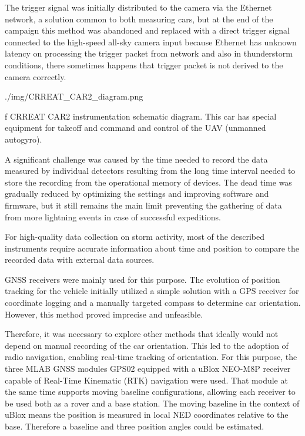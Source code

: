 The trigger signal was initially distributed to the camera via the Ethernet network, a solution common to both measuring cars, but at the end of the campaign this method was abandoned and replaced with a direct trigger signal connected to the high-speed all-sky camera input because Ethernet has unknown latency on processing the trigger packet from network and also in thunderstorm conditions, there sometimes happens that trigger packet is not derived to the camera correctly.

\medskip
{}
\picw=15cm \cinspic ./img/CRREAT_CAR2_diagram.png
\caption/f  CRREAT CAR2 instrumentation schematic diagram. This car has special equipment for takeoff and command and control of the UAV (unmanned autogyro).
\medskip

A significant challenge was caused by the time needed to record the data measured by individual detectors resulting from the long time interval needed to store the recording from the operational memory of devices. The dead time was gradually reduced by optimizing the settings and improving software and firmware, but it still remains the main limit preventing the gathering of data from more lightning events in case of successful expeditions.

For high-quality data collection on storm activity, most of the described instruments require accurate information about time and position to compare the recorded data with external data sources.

GNSS receivers were mainly used for this purpose. The evolution of position tracking for the vehicle initially utilized a simple solution with a GPS receiver for coordinate logging and a manually targeted compass to determine car orientation. However, this method proved imprecise and unfeasible.

Therefore, it was necessary to explore other methods that ideally would not depend on manual recording of the car orientation. This led to the adoption of radio navigation, enabling real-time tracking of orientation. For this purpose, the three MLAB GNSS modules GPS02 equipped with a uBlox NEO-M8P receiver capable of Real-Time Kinematic (RTK) navigation were used. That module at the same time supports moving baseline configurations, allowing each receiver to be used both as a rover and a base station. The moving baseline in the context of uBlox means the  position is measured in local NED coordinates relative to the base. Therefore a baseline and three position angles could be estimated.

